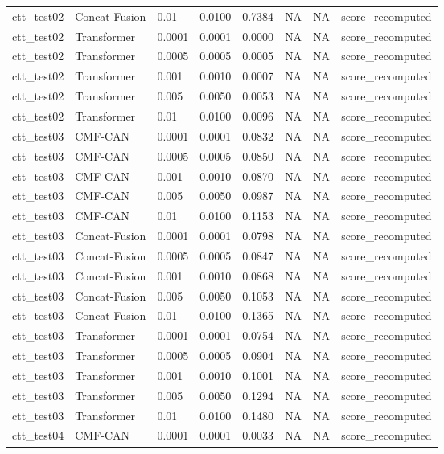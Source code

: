 \begin{tabular}{llllllll}
ctt_test02 & Concat-Fusion & 0.01 & 0.0100 & 0.7384 & NA & NA & score_recomputed \\
ctt_test02 & Transformer & 0.0001 & 0.0001 & 0.0000 & NA & NA & score_recomputed \\
ctt_test02 & Transformer & 0.0005 & 0.0005 & 0.0005 & NA & NA & score_recomputed \\
ctt_test02 & Transformer & 0.001 & 0.0010 & 0.0007 & NA & NA & score_recomputed \\
ctt_test02 & Transformer & 0.005 & 0.0050 & 0.0053 & NA & NA & score_recomputed \\
ctt_test02 & Transformer & 0.01 & 0.0100 & 0.0096 & NA & NA & score_recomputed \\
ctt_test03 & CMF-CAN & 0.0001 & 0.0001 & 0.0832 & NA & NA & score_recomputed \\
ctt_test03 & CMF-CAN & 0.0005 & 0.0005 & 0.0850 & NA & NA & score_recomputed \\
ctt_test03 & CMF-CAN & 0.001 & 0.0010 & 0.0870 & NA & NA & score_recomputed \\
ctt_test03 & CMF-CAN & 0.005 & 0.0050 & 0.0987 & NA & NA & score_recomputed \\
ctt_test03 & CMF-CAN & 0.01 & 0.0100 & 0.1153 & NA & NA & score_recomputed \\
ctt_test03 & Concat-Fusion & 0.0001 & 0.0001 & 0.0798 & NA & NA & score_recomputed \\
ctt_test03 & Concat-Fusion & 0.0005 & 0.0005 & 0.0847 & NA & NA & score_recomputed \\
ctt_test03 & Concat-Fusion & 0.001 & 0.0010 & 0.0868 & NA & NA & score_recomputed \\
ctt_test03 & Concat-Fusion & 0.005 & 0.0050 & 0.1053 & NA & NA & score_recomputed \\
ctt_test03 & Concat-Fusion & 0.01 & 0.0100 & 0.1365 & NA & NA & score_recomputed \\
ctt_test03 & Transformer & 0.0001 & 0.0001 & 0.0754 & NA & NA & score_recomputed \\
ctt_test03 & Transformer & 0.0005 & 0.0005 & 0.0904 & NA & NA & score_recomputed \\
ctt_test03 & Transformer & 0.001 & 0.0010 & 0.1001 & NA & NA & score_recomputed \\
ctt_test03 & Transformer & 0.005 & 0.0050 & 0.1294 & NA & NA & score_recomputed \\
ctt_test03 & Transformer & 0.01 & 0.0100 & 0.1480 & NA & NA & score_recomputed \\
ctt_test04 & CMF-CAN & 0.0001 & 0.0001 & 0.0033 & NA & NA & score_recomputed \\

\end{tabular}

